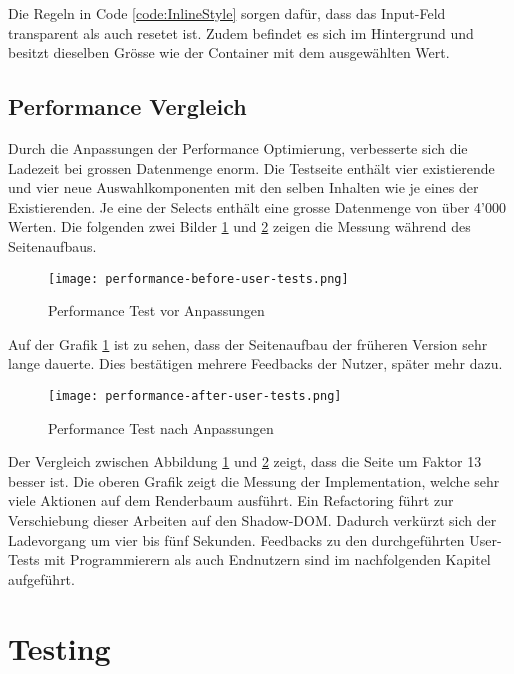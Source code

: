 Die Regeln in Code \ref{code:InlineStyle} sorgen dafür, dass das Input-Feld transparent als auch resetet ist.
Zudem befindet es sich im Hintergrund und besitzt dieselben Grösse wie der Container mit dem ausgewählten Wert.

\subsection{Performance Vergleich}
\label{sec:performanceCompare}

Durch die Anpassungen der Performance Optimierung, verbesserte sich die Ladezeit bei grossen Datenmenge enorm.
Die Testseite enthält vier existierende und vier neue Auswahlkomponenten mit den selben Inhalten wie je eines der Existierenden.
Je eine der Selects enthält eine grosse Datenmenge von über 4'000 Werten.
Die folgenden zwei Bilder \ref{img:PerformanceTestBefore} und \ref{img:PerformanceTestAfter} zeigen die Messung während des Seitenaufbaus.

\begin{figure}[!htb]
    \centering
    \texttt{[image: performance-before-user-tests.png]}
    \caption{Performance Test vor Anpassungen}
    \label{img:PerformanceTestBefore}
\end{figure}

Auf der Grafik \ref{img:PerformanceTestBefore} ist zu sehen, dass der Seitenaufbau der früheren Version sehr lange dauerte. %
Dies bestätigen mehrere Feedbacks der Nutzer, später mehr dazu.

\begin{figure}[!htb]
    \centering
    \texttt{[image: performance-after-user-tests.png]}
    \caption{Performance Test nach Anpassungen}
    \label{img:PerformanceTestAfter}
\end{figure}

Der Vergleich zwischen Abbildung \ref{img:PerformanceTestBefore} und \ref{img:PerformanceTestAfter} zeigt, dass die Seite um Faktor 13 besser ist.
Die oberen Grafik zeigt die Messung der Implementation, welche sehr viele Aktionen auf dem Renderbaum ausführt.
Ein Refactoring führt zur Verschiebung dieser Arbeiten auf den Shadow-DOM.
Dadurch verkürzt sich der Ladevorgang um vier bis fünf Sekunden.
Feedbacks zu den durchgeführten User-Tests mit Programmierern als auch Endnutzern sind im nachfolgenden Kapitel aufgeführt.


\section{Testing}
\label{sec:testing}

